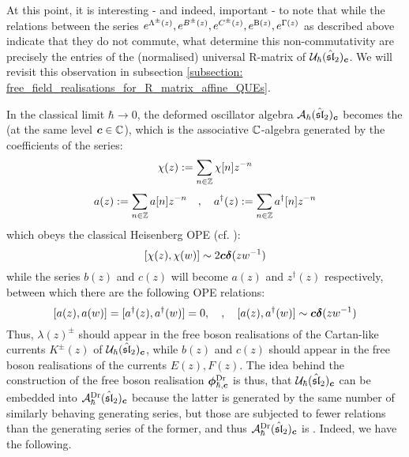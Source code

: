             \begin{remark}
                At this point, it is interesting - and indeed, important - to note that while the relations between the series $e^{\Lambda^{\pm}(z)}, e^{B^{\pm}(z)}, e^{C^{\pm}(z)}, e^{\mathrm{B}(z)}, e^{\Gamma(z)}$ as described above indicate that they do not commute, what determine this non-commutativity are precisely the entries of the (normalised) universal R-matrix of $\mathcal{U}_{\hbar}(\hat{\mathfrak{sl}}_2)_{\boldsymbol{c}}$. We will revisit this observation in subsection \ref{subsection: free_field_realisations_for_R_matrix_affine_QUEs}.
            \end{remark}
            
            In the classical limit $\hbar \to 0$, the deformed oscillator algebra $\mathcal{A}_{\hbar}(\hat{\mathfrak{sl}}_2)_{\boldsymbol{c}}$ becomes the  (at the same level $\boldsymbol{c} \in \mathbb{C}$), which is the associative $\mathbb{C}$-algebra generated by the coefficients of the series:
                $$\chi(z) := \sum_{n \in \mathbb{Z}} \chi[n] z^{-n}$$
                $$a(z) := \sum_{n \in \mathbb{Z}} a[n] z^{-n} \quad, \quad a^{\dagger}(z) := \sum_{n \in \mathbb{Z}} a^{\dagger}[n] z^{-n}$$
            which obeys the classical Heisenberg OPE (cf. \cite[Subsection 2.3.2]{frenkel_ben_zvi_vertex_algebras_and_algebraic_curves}):
                \begin{equation} \label{equation: classical_heisenberg_OPE}
                    [\chi(z), \chi(w)] \sim 2 \boldsymbol{c} \boldsymbol{\delta}(zw^{-1})
                \end{equation}
            while the series $b(z)$ and $c(z)$ will become $a(z)$ and $z^{\dagger}(z)$ respectively, between which there are the following OPE relations:
                \begin{equation} \label{equation: classical_weyl_OPE}
                    [a(z), a(w)] = [a^{\dagger}(z), a^{\dagger}(w)] = 0, \quad, \quad [a(z), a^{\dagger}(w)] \sim \boldsymbol{c} \boldsymbol{\delta}(zw^{-1})
                \end{equation}
            Thus, $\lambda(z)^{\pm}$ should appear in the free boson realisations of the Cartan-like currents $K^{\pm}(z)$ of $\mathcal{U}_{\hbar}(\hat{\mathfrak{sl}}_2)_{\boldsymbol{c}}$, while $b(z)$ and $c(z)$ should appear in the free boson realisations of the  currents $E(z), F(z)$. The idea behind the construction of the free boson realisation $\boldsymbol{\phi}^{\mathrm{Dr}}_{\hbar, \boldsymbol{c}}$ is thus, that $\mathcal{U}_{\hbar}(\hat{\mathfrak{sl}}_2)_{\boldsymbol{c}}$ can be embedded into $\mathcal{A}_{\hbar}^{\mathrm{Dr}}(\hat{\mathfrak{sl}}_2)_{\boldsymbol{c}}$ because the latter is generated by the same number of similarly behaving generating series, but those are subjected to fewer relations than the generating series of the former, and thus $\mathcal{A}_{\hbar}^{\mathrm{Dr}}(\hat{\mathfrak{sl}}_2)_{\boldsymbol{c}}$ is . Indeed, we have the following.
